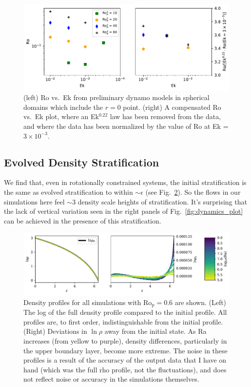 \begin{figure}[ht!]
\includegraphics[width=\textwidth]{./figs/revisions/mdwarfs_rop.pdf}
\caption[Filtered initial \pro$\,$ results and scalings in spherical simulations.]{ (left) Ro vs.~Ek from preliminary dynamo models in spherical domains which include the $r = 0$ point.
		  (right) A compensated Ro vs.~Ek plot, where an Ek$^{0.22}$ law has been removed from the data, and where the data has been normalized by the value of Ro at Ek = $3 \times 10^{-3}$.
	\label{fig:mdwarfs_rop} }
\end{figure}


\subsection{Evolved Density Stratification}
We find that, even in rotationally constrained systems, the initial stratification is the same as evolved stratification to within $\sim\epsilon$ (see Fig.~\ref{fig:rot_density}). 
So the flows in our simulations here feel $\sim$3 density scale heights of stratification.
It's surprising that the lack of vertical variation seen in the right panels of Fig.~\ref{fig:dynamics_plot} can be achieved in the presence of this stratification.
\begin{figure}[b!]
\includegraphics[width=\textwidth]{./figs/revisions/rot_density.pdf}
\caption[Evolved density stratification in rotating convection simulations.]{ 
	Density profiles for all simulations with Ro$_{\text{p}} = 0.6$ are shown.
	(Left) The log of the full density profile compared to the initial profile.
	All profiles are, to first order, indistinguishable from the initial profile.
	(Right) Deviations in $\ln\rho$ away from the initial state.
	As Ra increases (from yellow to purple), density differences, particularly in the upper boundary layer, become more extreme.
	The noise in these profiles is a result of the accuracy of the output data that I have on hand (which was the full rho profile, not the fluctuations), and does not reflect noise or accuracy in the simulations themselves.
	\label{fig:rot_density} }
\end{figure}

